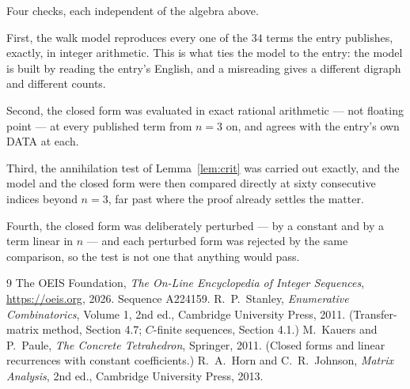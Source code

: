 \documentclass[11pt,a4paper]{article}
\theoremstyle{plain}
\theoremstyle{definition}
\begin{document}
Four checks, each independent of the algebra above.

First, the walk model reproduces every one of the $34$ terms the entry publishes,
exactly, in integer arithmetic. This is what ties the model to the entry: the model is built
by reading the entry's English, and a misreading gives a different digraph and different
counts.

Second, the closed form was evaluated in exact rational arithmetic --- not floating point ---
at every published term from $n=3$ on, and agrees with the entry's own DATA at each.

Third, the annihilation test of Lemma~\ref{lem:crit} was carried out exactly, and the model
and the closed form were then compared directly at sixty consecutive indices beyond
$n=3$, far past where the proof already settles the matter.

Fourth, the closed form was deliberately perturbed --- by a constant and by a term linear in
$n$ --- and each perturbed form was rejected by the same comparison, so the test is not one
that anything would pass.

\begin{thebibliography}{9}
 The OEIS Foundation, \emph{The On-Line Encyclopedia of Integer
Sequences}, \url{https://oeis.org}, 2026. Sequence A224159.
 R.~P.~Stanley, \emph{Enumerative Combinatorics}, Volume 1, 2nd ed.,
Cambridge University Press, 2011. (Transfer-matrix method, Section 4.7; $C$-finite sequences,
Section 4.1.)
 M.~Kauers and P.~Paule, \emph{The Concrete Tetrahedron}, Springer, 2011.
(Closed forms and linear recurrences with constant coefficients.)
 R.~A.~Horn and C.~R.~Johnson, \emph{Matrix Analysis}, 2nd ed., Cambridge
University Press, 2013.
\end{thebibliography}
\end{document}
